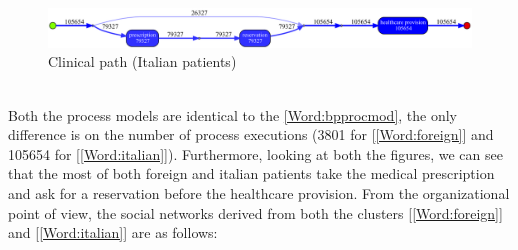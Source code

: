 \begin{figure} [htbp]
\includegraphics[width=\textwidth , keepaspectratio]{AmbulatoriInductiveVisualMinerItalians}
\caption{Clinical path (Italian patients)}
\end{figure}\\
Both the process models are identical to the \ref{Word:bpprocmod}, the only difference is on the number of process executions (3801 for [\ref{Word:foreign}] and 105654 for [\ref{Word:italian}]). Furthermore, looking at both the figures, we can see that the most of both foreign and italian patients take the medical prescription and ask for a reservation before the healthcare provision. From the organizational point of view, the social networks derived from both the clusters [\ref{Word:foreign}] and [\ref{Word:italian}] are as follows:

